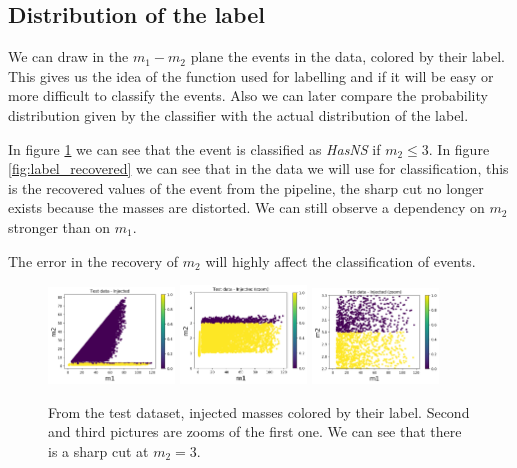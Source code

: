 \documentclass[prd,aps,twocolumn,a4paper,showkeys,nofootinbib]{revtex4-2}
\begin{document}
\subsection{Distribution of the label}
We can draw in the $m_1-m_2$ plane the events in the data, colored by their label. This gives us the idea of the function used for labelling and if it will be easy or more difficult to classify the events. Also we can later compare the probability distribution given by the classifier with the actual distribution of the label.

In figure \ref{fig:label_injected} we can see that the event is classified as \textit{HasNS} if $m_2\leq3$.  In figure \ref{fig:label_recovered} we can see that in the data we will use for classification, this is the recovered values of the event from the pipeline, the sharp cut no longer exists because the masses are distorted. We can still observe a dependency on $m_2$ stronger than on $m_1$.

The error in the recovery of $m_2$ will highly affect the classification of events.

\begin{figure}[]
  \center
  \includegraphics[width=0.3\textwidth]{./FigNS/label_injected}
  \includegraphics[width=0.3\textwidth]{./FigNS/label_injected_1}
  \includegraphics[width=0.3\textwidth]{./FigNS/label_injected_2}
  \caption{\label{fig:label_injected} From the test dataset, injected masses colored by their label. Second and third pictures are zooms of the first one. We can see that there is a sharp cut at $m_2=3$.}
\end{figure}
\end{document}
